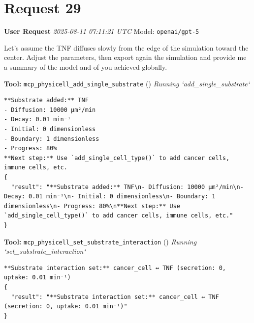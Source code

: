 \documentclass[11pt,a4paper]{article}
\begin{document}
\section{Request 29}
\begin{userbox}
\textbf{User Request}
\quad \textit{2025-08-11 07:11:21 UTC}
\quad Model: \texttt{openai/gpt-5}

Let's assume the TNF diffuses slowly from the edge of the simulation toward the center. Adjust the parameters, then export again the simulation and provide me a summary of the model and of you achieved globally.

\end{userbox}
\begin{toolokbox}
\textbf{Tool:} \texttt{mcp\_physicell\_add\_single\_substrate} (\checkmark)
\textit{Running `add\_single\_substrate`}
\begin{lstlisting}
**Substrate added:** TNF
- Diffusion: 10000 μm²/min
- Decay: 0.01 min⁻¹
- Initial: 0 dimensionless
- Boundary: 1 dimensionless
- Progress: 80%
**Next step:** Use `add_single_cell_type()` to add cancer cells, immune cells, etc.
{
  "result": "**Substrate added:** TNF\n- Diffusion: 10000 μm²/min\n- Decay: 0.01 min⁻¹\n- Initial: 0 dimensionless\n- Boundary: 1 dimensionless\n- Progress: 80%\n**Next step:** Use `add_single_cell_type()` to add cancer cells, immune cells, etc."
}
\end{lstlisting}
\end{toolokbox}
\begin{toolokbox}
\textbf{Tool:} \texttt{mcp\_physicell\_set\_substrate\_interaction} (\checkmark)
\textit{Running `set\_substrate\_interaction`}
\begin{lstlisting}
**Substrate interaction set:** cancer_cell ↔ TNF (secretion: 0, uptake: 0.01 min⁻¹)
{
  "result": "**Substrate interaction set:** cancer_cell ↔ TNF (secretion: 0, uptake: 0.01 min⁻¹)"
}
\end{lstlisting}
\end{toolokbox}
\end{document}
